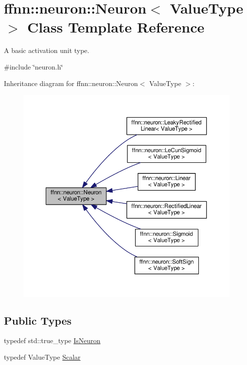 \hypertarget{classffnn_1_1neuron_1_1_neuron}{\section{ffnn\-:\-:neuron\-:\-:Neuron$<$ Value\-Type $>$ Class Template Reference}
\label{classffnn_1_1neuron_1_1_neuron}
}


A basic activation unit type.  




{\ttfamily \#include \char`\"{}neuron.\-h\char`\"{}}



Inheritance diagram for ffnn\-:\-:neuron\-:\-:Neuron$<$ Value\-Type $>$\-:\nopagebreak
\begin{figure}[H]
\begin{center}
\leavevmode
\includegraphics[width=350pt]{classffnn_1_1neuron_1_1_neuron__inherit__graph}
\end{center}
\end{figure}
\subsection*{Public Types}
\begin{DoxyCompactItemize}
\item 
typedef std\-::true\-\_\-type \hyperlink{classffnn_1_1neuron_1_1_neuron_a75bfde562dcb9d0e606f52ca73451de8}{Is\-Neuron}
\item 
typedef Value\-Type \hyperlink{classffnn_1_1neuron_1_1_neuron_a5c758fa2e21a6dc3de42b34016b93d56}{Scalar}
\end{DoxyCompactItemize}
